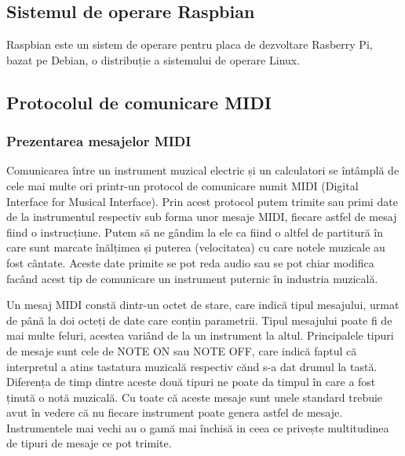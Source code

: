 \documentclass[../IoMusT.tex]{subfiles}
\begin{document}
\subsection{Sistemul de operare Raspbian}
Raspbian este un sistem de operare pentru placa de dezvoltare Rasberry Pi, bazat pe Debian, o distribuție a sistemului de operare Linux.
\subsection{Protocolul de comunicare MIDI}
\subsubsection{Prezentarea mesajelor MIDI}
Comunicarea între un instrument muzical electric și un calculatori se întâmplă de cele mai multe ori printr-un protocol de comunicare numit MIDI (Digital Interface for Musical Interface). Prin acest protocol putem trimite sau primi date de la instrumentul respectiv sub forma unor mesaje MIDI, fiecare astfel de mesaj fiind o instrucțiune. Putem să ne gândim la ele ca fiind o altfel de partitură în care sunt marcate înălțimea și puterea (velocitatea) cu care notele muzicale au fost cântate. Aceste date primite se pot reda audio sau se pot chiar modifica facând acest tip de comunicare un instrument puternic în industria muzicală. 
\\
\par Un mesaj MIDI constă dintr-un octet de stare, care indică tipul mesajului, urmat de până la doi octeți de date care conțin parametrii. Tipul mesajului poate fi de mai multe feluri, acestea variând de la un instrument la altul. Principalele tipuri de mesaje sunt cele de NOTE ON sau NOTE OFF, care indică faptul că interpretul a atins tastatura muzicală respectiv cănd s-a dat drumul la tastă. Diferența de timp dintre aceste două tipuri ne poate da timpul în care a fost ținută o notă muzicală. Cu toate că aceste mesaje sunt unele standard trebuie avut în vedere că nu fiecare instrument poate genera astfel de mesaje. Instrumentele mai vechi au o gamă mai închisă in ceea ce privește multitudinea de tipuri de mesaje ce pot trimite.
\\ 
\end{document}
